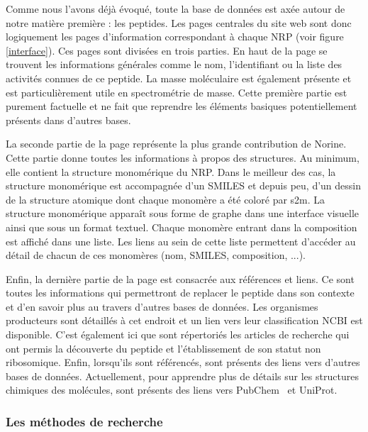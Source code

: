 Comme nous l'avons déjà évoqué, toute la base de données est axée autour de notre matière première : les peptides.
Les pages centrales du site web sont donc logiquement les pages d'information correspondant à chaque NRP (voir figure \ref{interface}).
Ces pages sont divisées en trois parties.
En haut de la page se trouvent les informations générales comme le nom, l'identifiant ou la liste des activités connues de ce peptide.
La masse moléculaire est également présente et est particulièrement utile en spectrométrie de masse.
Cette première partie est purement factuelle et ne fait que reprendre les éléments basiques potentiellement présents dans d'autres bases.

La seconde partie de la page représente la plus grande contribution de Norine.
Cette partie donne toutes les informations à propos des structures.
Au minimum, elle contient la structure monomérique du NRP.
Dans le meilleur des cas, la structure monomérique est accompagnée d'un SMILES et depuis peu, d'un dessin de la structure atomique dont chaque monomère a été coloré par s2m.
La structure monomérique apparaît sous forme de graphe dans une interface visuelle ainsi que sous un format textuel.
Chaque monomère entrant dans la composition est affiché dans une liste.
Les liens au sein de cette liste permettent d'accéder au détail de chacun de ces monomères (nom, SMILES, composition, ...).

Enfin, la dernière partie de la page est consacrée aux références et liens.
Ce sont toutes les informations qui permettront de replacer le peptide dans son contexte et d'en savoir plus au travers d'autres bases de données.
Les organismes producteurs sont détaillés à cet endroit et un lien vers leur classification NCBI est disponible.
C'est également ici que sont répertoriés les articles de recherche qui ont permis la découverte du peptide et l'établissement de son statut non ribosomique.
Enfin, lorsqu'ils sont référencés, sont présents des liens vers d'autres bases de données.
Actuellement, pour apprendre plus de détails sur les structures chimiques des molécules, sont présents des liens vers PubChem~\cite{kim_pubchem_2015} et UniProt.


\subsubsection{Les méthodes de recherche}

